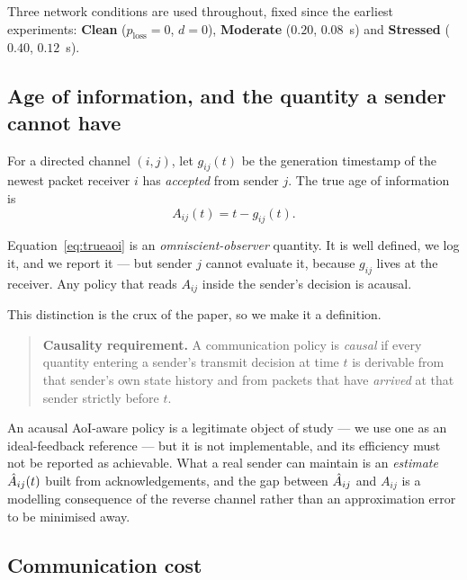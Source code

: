 Three network conditions are used throughout, fixed since the earliest
experiments: \textbf{Clean} ($p_{\mathrm{loss}}=0$, $d=0$),
\textbf{Moderate} ($0.20$, $0.08$~s) and \textbf{Stressed}
($0.40$, $0.12$~s).

\subsection{Age of information, and the quantity a sender cannot have}

For a directed channel $(i,j)$, let $g_{ij}(t)$ be the generation
timestamp of the newest packet receiver $i$ has \emph{accepted} from
sender $j$. The true age of information is
\begin{equation}
A_{ij}(t) = t - g_{ij}(t) .
\label{eq:trueaoi}
\end{equation}

Equation~\eqref{eq:trueaoi} is an \emph{omniscient-observer} quantity. It
is well defined, we log it, and we report it --- but sender $j$ cannot
evaluate it, because $g_{ij}$ lives at the receiver. Any policy that reads
$A_{ij}$ inside the sender's decision is acausal.

This distinction is the crux of the paper, so we make it a definition.

\begin{quote}
\textbf{Causality requirement.} A communication policy is \emph{causal} if
every quantity entering a sender's transmit decision at time $t$ is
derivable from that sender's own state history and from packets that have
\emph{arrived} at that sender strictly before $t$.
\end{quote}

An acausal AoI-aware policy is a legitimate object of study --- we use one
as an ideal-feedback reference --- but it is not implementable, and its efficiency
must not be reported as achievable. What a real sender can maintain is an
\emph{estimate} $\hat{A}_{ij}(t)$ built from acknowledgements, and the gap
between $\hat{A}_{ij}$ and $A_{ij}$ is a modelling consequence of the
reverse channel rather than an approximation error to be minimised away.

\subsection{Communication cost}

